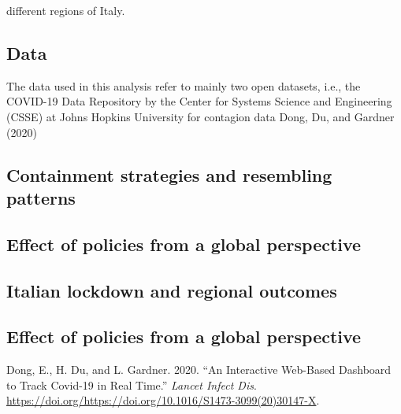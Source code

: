 \documentclass[
  12pt,
]{article}
\begin{document}
different regions of Italy.

\hypertarget{data}{%
\subsection{Data}\label{data}}

The data used in this analysis refer to mainly two open datasets, i.e.,
the COVID-19 Data Repository by the Center for Systems Science and
Engineering (CSSE) at Johns Hopkins University for contagion data Dong,
Du, and Gardner (2020)

\hypertarget{containment-strategies-and-resembling-patterns}{%
\subsection{Containment strategies and resembling
patterns}\label{containment-strategies-and-resembling-patterns}}

\hypertarget{effect-of-policies-from-a-global-perspective}{%
\subsection{Effect of policies from a global
perspective}\label{effect-of-policies-from-a-global-perspective}}

\hypertarget{italian-lockdown-and-regional-outcomes}{%
\subsection{Italian lockdown and regional
outcomes}\label{italian-lockdown-and-regional-outcomes}}

\hypertarget{effect-of-policies-from-a-global-perspective-1}{%
\subsection*{Effect of policies from a global
perspective}\label{effect-of-policies-from-a-global-perspective-1}}

\hypertarget{refs}{}
\leavevmode\hypertarget{ref-Jhon}{}%
Dong, E., H. Du, and L. Gardner. 2020. ``An Interactive Web-Based
Dashboard to Track Covid-19 in Real Time.'' \emph{Lancet Infect Dis}.
\url{https://doi.org/https://doi.org/10.1016/S1473-3099(20)30147-X}.
\end{document}

